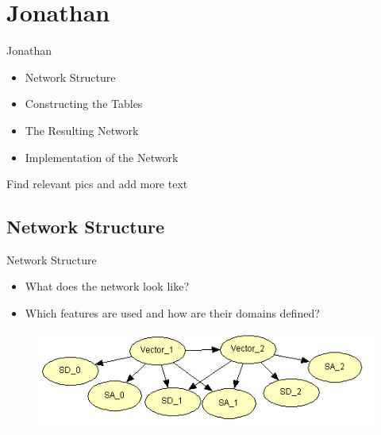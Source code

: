 \section{Jonathan}
\begin{frame}{Jonathan}
\begin{itemize}
\item Network Structure
\item Constructing the Tables
\item The Resulting Network
\item Implementation of the Network
\end{itemize}
Find relevant pics and add more text
\end{frame}

\subsection{Network Structure}
\begin{frame}{Network Structure}
\begin{itemize}
\item What does the network look like?
\item Which features are used and how are their domains defined?
\end{itemize}
\begin{figure}
  \includegraphics[scale=0.8]{figures/BNDone.PNG}
\end{figure}
\end{frame}

